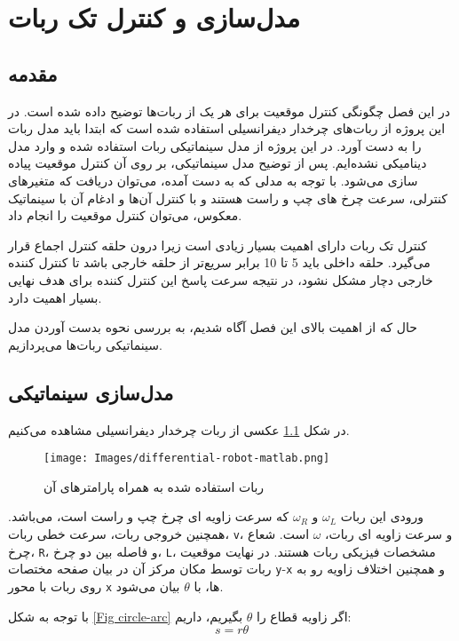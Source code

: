 \chapter{مدل‌سازی و کنترل تک ربات‌}\label{ch one robot}
\section{مقدمه}
در این فصل چگونگی کنترل موقعیت برای هر یک از ربات‌ها توضیح داده شده است. در این پروژه از ربات‌های چرخدار دیفرانسیلی  استفاده شده است که ابتدا باید مدل ربات را به دست آورد. در این پروژه از مدل سینماتیکی  ربات استفاده شده و وارد مدل دینامیکی نشده‌ایم. پس از توضیح مدل سینماتیکی، بر روی آن کنترل موقعیت پیاده سازی می‌شود. با توجه به مدلی که به دست آمده، می‌توان دریافت که متغیرهای کنترلی، سرعت چرخ های چپ و راست هستند و با کنترل آن‌ها و ادغام آن با سینماتیک معکوس، می‌توان کنترل موقعیت را انجام داد.

کنترل تک ربات دارای اهمیت بسیار زیادی است زیرا درون حلقه کنترل اجماع قرار می‌گیرد. حلقه داخلی باید 5 تا 10 برابر سریع‌تر از حلقه خارجی باشد تا کنترل کننده خارجی دچار مشکل نشود، در نتیجه سرعت پاسخ این کنترل کننده برای هدف نهایی بسیار اهمیت دارد.

حال که از اهمیت بالای این فصل آگاه شدیم، به بررسی نحوه بدست آوردن مدل سینماتیکی ربات‌ها می‌پردازیم.
 
\section{مدل‌سازی سینماتیکی}

در شکل \ref{Fig differential-robot} عکسی از ربات چرخدار دیفرانسیلی مشاهده می‌کنیم. 
\begin{figure}[!h]
	\centering
	\texttt{[image: Images/differential-robot-matlab.png]}
	\caption{ربات استفاده شده به همراه پارامترهای آن}\label{Fig differential-robot}
\end{figure}

ورودی این ربات $\omega_L$ و $\omega_R$ که سرعت زاویه ای چرخ چپ و راست است، می‌باشد. همچنین خروجی ربات، سرعت خطی ربات، 
\verb|v|، و سرعت زاویه ای ربات، $\omega$ است. شعاع چرخ، 
\verb|R|، و فاصله بین دو چرخ، 
\verb|L|، مشخصات فیزیکی ربات هستند. در نهایت موقعیت ربات توسط مکان مرکز آن در بیان صفحه مختصات 
\verb|y|-\verb|x| و همچنین اختلاف زاویه رو به روی ربات با محور 
 \verb|x|  ها، با $\theta$ بیان می‌شود.

با توجه به شکل \ref{Fig circle-arc} اگر زاویه قطاع را $\theta$ بگیریم، داریم:
\begin{equation}
s = r\theta
\end{equation}

